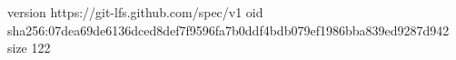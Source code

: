 version https://git-lfs.github.com/spec/v1
oid sha256:07dea69de6136dced8def7f9596fa7b0ddf4bdb079ef1986bba839ed9287d942
size 122

